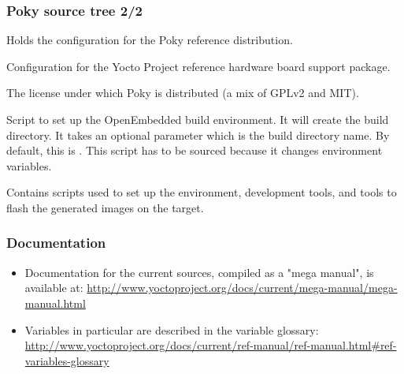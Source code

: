 \begin{frame}
  \frametitle{Poky source tree 2/2}
  \begin{description}[style=nextline]
  \item[meta-yocto/] Holds the configuration for the Poky
    reference distribution.
  \item[meta-yocto-bsp/] Configuration for the Yocto Project
    reference hardware board support package.
  \item[LICENSE] The license under which Poky is distributed (a mix of
    GPLv2 and MIT).
  \item[oe-init-build-env] Script to set up the OpenEmbedded build
    environment. It will create the build directory. It takes an optional
    parameter which is the build directory name. By default, this is
    . This script has to be sourced because it changes
    environment variables.
  \item[scripts] Contains scripts used to set up the environment,
    development tools, and tools to flash the generated images on the
    target.
  \end{description}
\end{frame}

\begin{frame}
  \frametitle{Documentation}
  \begin{itemize}
    \item Documentation for the current sources, compiled as a "mega
      manual", is available at:
      \url{http://www.yoctoproject.org/docs/current/mega-manual/mega-manual.html}
    \item Variables in particular are described in the variable
      glossary:
      \url{http://www.yoctoproject.org/docs/current/ref-manual/ref-manual.html\#ref-variables-glossary}
  \end{itemize}
\end{frame}
